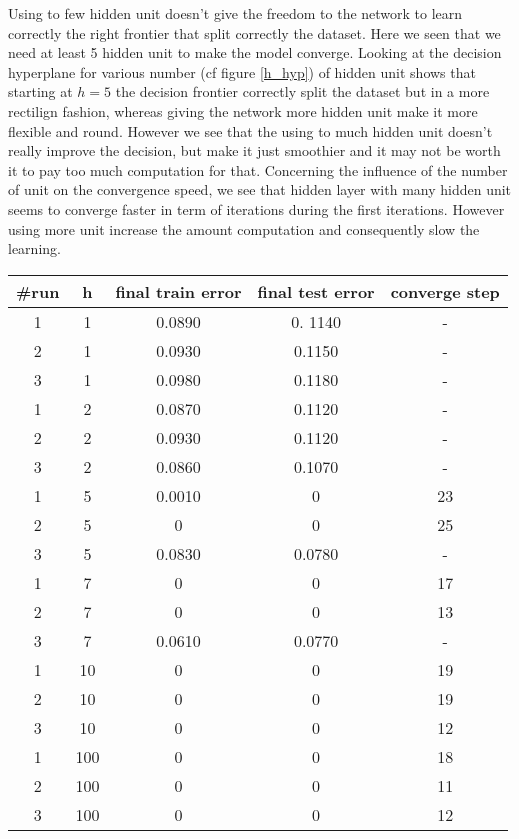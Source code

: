 \documentclass[a4paper,11pt]{exam}
\begin{document}
Using to few hidden unit doesn't give the freedom to the network to learn correctly the right frontier that split correctly the dataset. Here we seen that we need at least 5 hidden unit to make the model converge.
Looking at the decision hyperplane for various number (cf figure \ref{h_hyp}) of hidden unit shows that starting at $h = 5$ the decision frontier correctly split the dataset but in a more rectilign fashion, whereas giving the network more hidden unit make it more flexible and round. However we see that the using to much hidden unit doesn't really improve the decision, but make it just smoothier and it may not be worth it to pay too much computation for that.
Concerning the influence of the number of unit on the convergence speed, we see that hidden layer with many hidden unit seems to converge faster in term of iterations during the first iterations. However using more unit increase the amount computation and consequently slow the learning.

\begin{center}
\begin{tabular}{ c | c |  c | c | c }
	\#run & h & final train error & final test error & converge step \\
	\hline
	   1 & 1 & 0.0890 & 0. 1140 & - \\  
	   2 & 1 & 0.0930 &  0.1150 & - \\
	   3 & 1 & 0.0980 & 0.1180 & - \\
	   \hline
	   1 & 2 & 0.0870 & 0.1120 & - \\
	   2 & 2 & 0.0930 & 0.1120 & - \\
	   3 & 2 & 0.0860 & 0.1070 & - \\
	   \hline
	   1 & 5 & 0.0010 & 0 & 23 \\
	   2 & 5 & 0 & 0 & 25 \\
	   3 & 5 & 0.0830 & 0.0780 & - \\
	   \hline
	   1 & 7 & 0 & 0 & 17 \\
	   2 & 7 & 0 & 0 &  13 \\
	   3 & 7 & 0.0610 & 0.0770 & - \\
	   \hline
	   1 & 10 & 0 & 0 & 19 \\
	   2 & 10 & 0 & 0 & 19 \\
	   3 & 10 & 0 & 0 & 12 \\
	   \hline
	   1 & 100 & 0 & 0 & 18 \\
	   2 & 100 & 0 & 0 & 11 \\
	   3 & 100 & 0 & 0 & 12 \\
	 \hline
\end{tabular}
\end{center}
\end{document}
